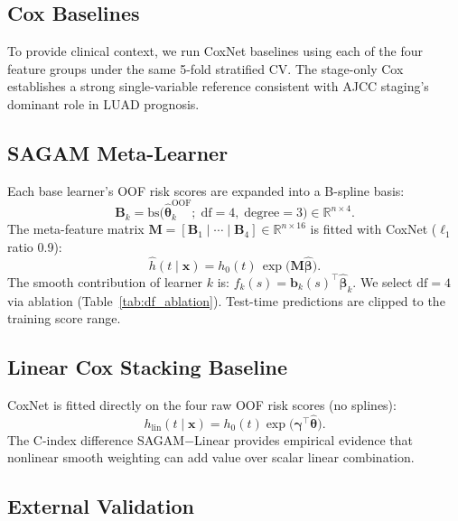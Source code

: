 \documentclass[conference]{IEEEtran}
\begin{document}
\subsection{Cox Baselines}

To provide clinical context, we run CoxNet baselines using each of the
four feature groups under the same 5-fold stratified CV.
The stage-only Cox establishes a strong single-variable reference consistent
with AJCC staging's dominant role in LUAD prognosis.

\subsection{SAGAM Meta-Learner}

Each base learner's OOF risk scores are expanded into a B-spline basis:
\begin{equation}
  \mathbf{B}_k = \mathrm{bs}\!\bigl(\hat{\boldsymbol{\theta}}_k^{\text{OOF}};\;
    \text{df}\!=\!4,\;\text{degree}\!=\!3\bigr) \in \mathbb{R}^{n \times 4}.
  \label{eq:spline}
\end{equation}
The meta-feature matrix $\mathbf{M} = [\mathbf{B}_1 \mid \cdots \mid
\mathbf{B}_4] \in \mathbb{R}^{n \times 16}$ is fitted with CoxNet
($\ell_1$ ratio 0.9):
\begin{equation}
  \hat{h}(t \mid \mathbf{x}) = h_0(t)\,\exp\!\bigl(\mathbf{M}\hat{\boldsymbol{\beta}}\bigr).
  \label{eq:cox}
\end{equation}
The smooth contribution of learner $k$ is:
$f_k(s) = \mathbf{b}_k(s)^\top \hat{\boldsymbol{\beta}}_k$.
We select $\text{df}\!=\!4$ via ablation (Table~\ref{tab:df_ablation}).
Test-time predictions are clipped to the training score range.

\subsection{Linear Cox Stacking Baseline}

CoxNet is fitted directly on the four raw OOF risk scores (no splines):
\begin{equation}
  h_{\text{lin}}(t \mid \mathbf{x}) =
    h_0(t)\exp\!\bigl(\boldsymbol{\gamma}^\top\hat{\boldsymbol{\theta}}\bigr).
\end{equation}
The C-index difference SAGAM$-$Linear provides empirical evidence that
nonlinear smooth weighting can add value over scalar linear combination.

\subsection{External Validation}
\end{document}
